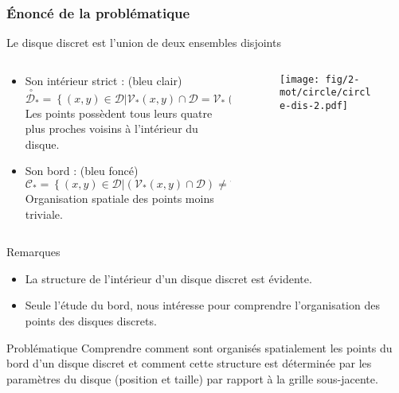 
\begin{frame}
\frametitle{Énoncé de la problématique}
\begin{block}{Le disque discret est l’union de deux ensembles disjoints}
  \begin{columns}[t]
    \begin{column}{0.65\linewidth}
      \begin{itemize}      
        \item Son intérieur strict : (bleu clair)
        $\stackrel{\ \circ}{\mathcal{D}}_{*} =  \left\{ (x,y) \in \mathcal{D} | \mathcal{V}_{*}(x,y) \cap \mathcal{D} = \mathcal{V}_{*}(x,y) \right\}$\\
        Les points possèdent tous leurs quatre plus proches voisins à l’intérieur du disque.
        \item Son bord : (bleu foncé)
        $\mathcal{C}_{*} =  \left\{ (x,y) \in \mathcal{D} | \left( \mathcal{V}_{*}(x,y) \cap \mathcal{D} \right) \neq \mathcal{V}_{*}(x,y) \right\}$\\
        Organisation spatiale des points moins triviale.
      \end{itemize}
    \end{column}
 
    \begin{column}{0.35\linewidth}
      \begin{figure}[H]
        \centering
        \texttt{[image: fig/2-mot/circle/circle-dis-2.pdf]}
       \end{figure}
    \end{column}
  \end{columns}
\end{block}


{
  \begin{exampleblock}{Remarques}
    \begin{itemize}
      \item La structure de l’intérieur d'un disque discret est évidente.
      \item Seule l’étude du bord, nous intéresse pour comprendre l’organisation des points des disques discrets.
    \end{itemize}
  \end{exampleblock} 
}
{
  \begin{alertblock}{Problématique}
    Comprendre comment sont organisés spatialement les points du bord d’un disque discret et comment cette structure est déterminée par les paramètres du disque (position et taille) par rapport à la grille sous-jacente.
  \end{alertblock}

}
\end{frame}

